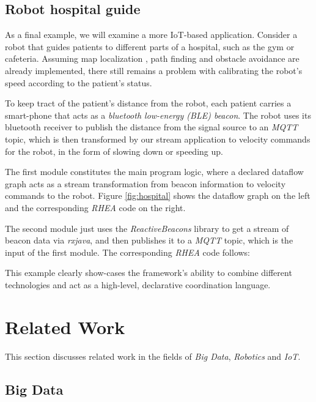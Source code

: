 \documentclass[sigplan,review,anonymous]{acmart}\settopmatter{printfolios=true}
\begin{document}
\subsection{Robot hospital guide}

As a final example, we will examine a more IoT-based application. Consider a robot that guides patients to different parts of a hospital, such as the gym or cafeteria. Assuming map localization , path finding and obstacle avoidance are already implemented, there still remains a problem with calibrating the robot's speed according to the patient's status. 

To keep tract of the patient's distance from the robot, each patient carries a smart-phone that acts as a \textit{bluetooth low-energy (BLE) beacon}. The robot uses its bluetooth receiver to publish the distance from the signal source to an \textit{MQTT} topic, which is then transformed by our stream application to velocity commands for the robot, in the form of slowing down or speeding up.

The first module constitutes the main program logic, where a declared dataflow graph acts as a stream transformation from beacon information to velocity commands to the robot. Figure \ref{fig:hospital} shows the dataflow graph on the left and the corresponding \textit{RHEA} code on the right.


The second module just uses the \textit{ReactiveBeacons} library to get a stream of beacon data via \textit{rxjava}, and then publishes it to a \textit{MQTT} topic, which is the input of the first module. The corresponding \textit{RHEA} code follows:
\\

This example clearly show-cases the framework's ability to combine different technologies and act as a high-level, declarative coordination language.



\section{Related Work}

This section discusses related work in the fields of \textit{Big Data}, \textit{Robotics} and \textit{IoT}.

\subsection{Big Data}
\end{document}
